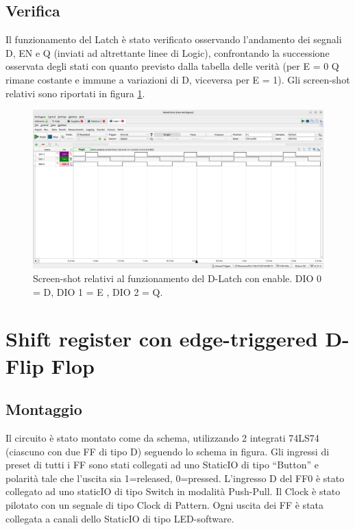 \documentclass[10pt,a4paper]{article}
\begin{document}
\subsection{Verifica}
Il funzionamento del Latch è stato verificato osservando l’andamento dei segnali D, EN e Q (inviati ad altrettante linee di Logic), confrontando la successione osservata degli stati con quanto previsto dalla tabella delle verità (per E = 0 Q rimane costante e immune a variazioni di D, viceversa per E = 1). Gli screen-shot relativi sono riportati in figura \ref{fig1}.

\begin{figure}[htp]
\begin{center}
\includegraphics[scale=0.25]{fig1.png}
\caption{Screen-shot relativi al funzionamento del D-Latch con enable. DIO 0 = D, DIO 1 = E , DIO 2 = Q.}
\label{fig1}
\end{center}
\end{figure}

\section{Shift register con edge-triggered D-Flip Flop}
\subsection{Montaggio}
Il circuito è stato montato come da schema, utilizzando 2 integrati 74LS74 (ciascuno con due FF di tipo D) seguendo lo schema in figura. Gli ingressi di preset di tutti i FF sono stati collegati ad uno StaticIO di tipo “Button” e polarità tale che l’uscita sia 1=released, 0=pressed. L’ingresso D del FF0 è stato collegato ad uno staticIO di tipo Switch in modalità Push-Pull. Il Clock è stato pilotato con un segnale di tipo Clock di Pattern. Ogni uscita dei FF è stata collegata a canali dello StaticIO di tipo LED-software.
\end{document}
